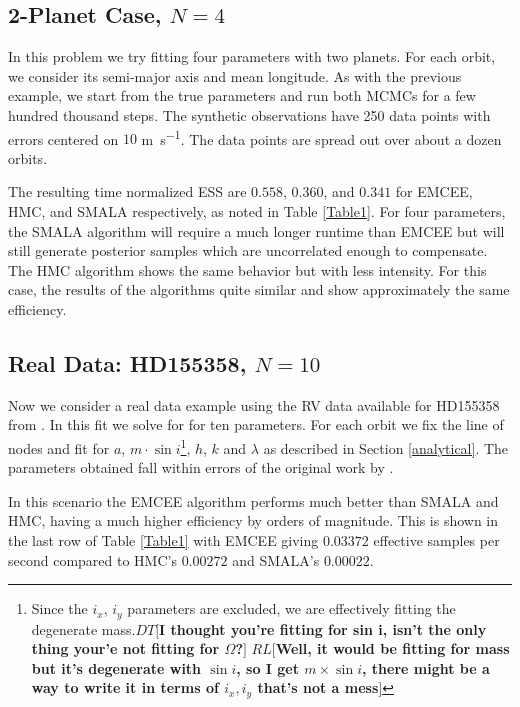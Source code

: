 \documentclass{aa}
\def\memodt#1{\color{green}$DT[${\bf #1}$]$ \color{black}}
\def\memorl#1{\color{gray}$RL[${\bf #1}$]$ \color{black}}
\begin{document}
\subsection{2-Planet Case, $N=4$}\label{n4section}

In this problem we try fitting four parameters with two planets.
For each orbit, we consider its semi-major axis and mean longitude.
As with the previous example, we start from the true parameters and run both MCMCs for a few hundred thousand steps. 
The synthetic observations have 250 data points with errors centered on $10$ \si{\metre\per\second}. 
The data points are spread out over about a dozen orbits.

The resulting time normalized ESS are $0.558$, $0.360$, and $0.341$ for EMCEE, HMC, and SMALA respectively, as noted in Table \ref{Table1}. 
For four parameters, the SMALA algorithm will require a much longer runtime than EMCEE but will still generate posterior samples which are uncorrelated enough to compensate. 
The HMC algorithm shows the same behavior but with less intensity. For this case, the results of the algorithms quite similar and show approximately the same efficiency.


\subsection{Real Data: HD155358, $N=10$}

Now we consider a real data example using the RV data available for HD155358 from \cite{Robertson2012}. 
In this fit we solve for for ten parameters. For each orbit we fix the line of nodes and fit for $a$, $m\cdot\sin i$\footnote{Since the $i_x$, $i_y$ parameters are excluded, we are effectively fitting the degenerate mass.\memodt{I thought you're fitting for sin i, isn't the only thing your'e not fitting for $\Omega$?}\memorl{Well, it would be fitting for mass but it's degenerate with $\sin i$, so I get $m \times \sin i$, there might be a way to write it in terms of $i_x, i_y$ that's not a mess}}, $h$, $k$ and $\lambda$ as described in Section \ref{analytical}. 
The parameters obtained fall within errors of the original work by \cite{Robertson2012}.

In this scenario the EMCEE algorithm performs much better than SMALA and HMC, having a much higher efficiency by orders of magnitude. 
This is shown in the last row of Table \ref{Table1} with EMCEE giving $0.03372$ effective samples per second compared to HMC's $0.00272$ and SMALA's $0.00022$.
\end{document}
